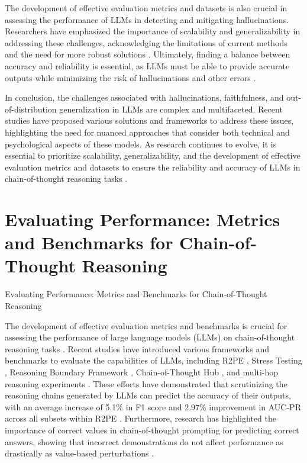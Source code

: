 \documentclass[conference]{IEEEtran}
\begin{document}
The development of effective evaluation metrics and datasets is also crucial in assessing the performance of LLMs in detecting and mitigating hallucinations. Researchers have emphasized the importance of scalability and generalizability in addressing these challenges, acknowledging the limitations of current methods and the need for more robust solutions \cite{b2} \cite{b3}. Ultimately, finding a balance between accuracy and reliability is essential, as LLMs must be able to provide accurate outputs while minimizing the risk of hallucinations and other errors \cite{b1} \cite{b4}.

In conclusion, the challenges associated with hallucinations, faithfulness, and out-of-distribution generalization in LLMs are complex and multifaceted. Recent studies have proposed various solutions and frameworks to address these issues, highlighting the need for nuanced approaches that consider both technical and psychological aspects of these models. As research continues to evolve, it is essential to prioritize scalability, generalizability, and the development of effective evaluation metrics and datasets to ensure the reliability and accuracy of LLMs in chain-of-thought reasoning tasks \cite{b1} \cite{b2} \cite{b3} \cite{b4} \cite{b5}.

\section{Evaluating Performance: Metrics and Benchmarks for Chain-of-Thought Reasoning}
Evaluating Performance: Metrics and Benchmarks for Chain-of-Thought Reasoning

The development of effective evaluation metrics and benchmarks is crucial for assessing the performance of large language models (LLMs) on chain-of-thought reasoning tasks \cite{b1}. Recent studies have introduced various frameworks and benchmarks to evaluate the capabilities of LLMs, including R2PE \cite{b2}, Stress Testing \cite{b3}, Reasoning Boundary Framework \cite{b4}, Chain-of-Thought Hub \cite{b5}, and multi-hop reasoning experiments \cite{b6}. These efforts have demonstrated that scrutinizing the reasoning chains generated by LLMs can predict the accuracy of their outputs, with an average increase of 5.1\% in F1 score and 2.97\% improvement in AUC-PR across all subsets within R2PE \cite{b2}. Furthermore, research has highlighted the importance of correct values in chain-of-thought prompting for predicting correct answers, showing that incorrect demonstrations do not affect performance as drastically as value-based perturbations \cite{b7}.
\end{document}
